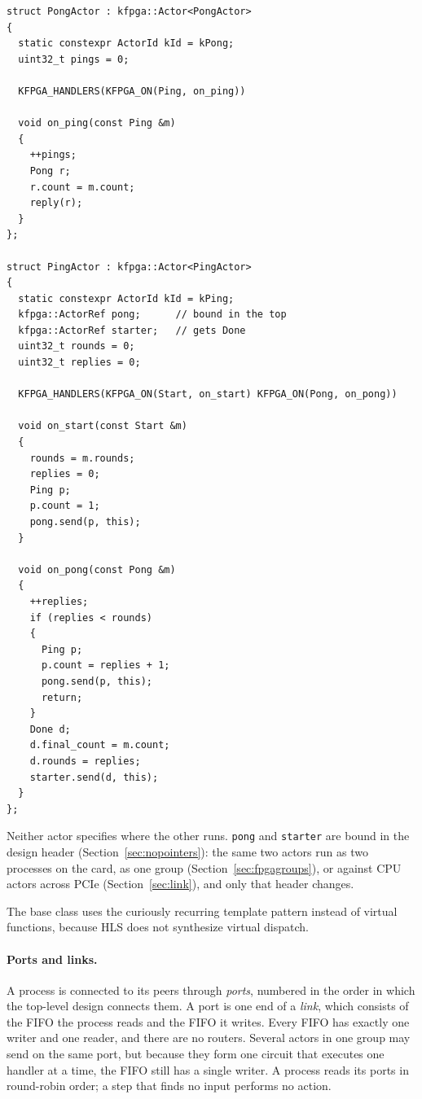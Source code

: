 \documentclass[11pt]{article}
\begin{document}
\begin{lstlisting}
struct PongActor : kfpga::Actor<PongActor>
{
  static constexpr ActorId kId = kPong;
  uint32_t pings = 0;

  KFPGA_HANDLERS(KFPGA_ON(Ping, on_ping))

  void on_ping(const Ping &m)
  {
    ++pings;
    Pong r;
    r.count = m.count;
    reply(r);
  }
};

struct PingActor : kfpga::Actor<PingActor>
{
  static constexpr ActorId kId = kPing;
  kfpga::ActorRef pong;      // bound in the top
  kfpga::ActorRef starter;   // gets Done
  uint32_t rounds = 0;
  uint32_t replies = 0;

  KFPGA_HANDLERS(KFPGA_ON(Start, on_start) KFPGA_ON(Pong, on_pong))

  void on_start(const Start &m)
  {
    rounds = m.rounds;
    replies = 0;
    Ping p;
    p.count = 1;
    pong.send(p, this);
  }

  void on_pong(const Pong &m)
  {
    ++replies;
    if (replies < rounds)
    {
      Ping p;
      p.count = replies + 1;
      pong.send(p, this);
      return;
    }
    Done d;
    d.final_count = m.count;
    d.rounds = replies;
    starter.send(d, this);
  }
};
\end{lstlisting}

\noindent Neither actor specifies where the other runs. \texttt{pong} and
\texttt{starter} are bound in the design header (Section~\ref{sec:nopointers}):
the same two actors run as two processes on the card, as one group
(Section~\ref{sec:fpgagroups}), or against CPU actors across PCIe
(Section~\ref{sec:link}), and only that header changes.

\noindent The base class uses the curiously recurring template pattern instead
of virtual functions, because HLS does not synthesize virtual dispatch.

\paragraph{Ports and links.} A process is connected to its peers through
\emph{ports}, numbered in the order in which the top-level design connects
them. A port is one end of a \emph{link}, which consists of the FIFO the
process reads and the FIFO it writes. Every FIFO has exactly one writer and one
reader, and there are no routers. Several actors in one group may send on the
same port, but because they form one circuit that executes one handler at a
time, the FIFO still has a single writer. A process reads its ports in
round-robin order; a step that finds no input performs no action.
\end{document}
